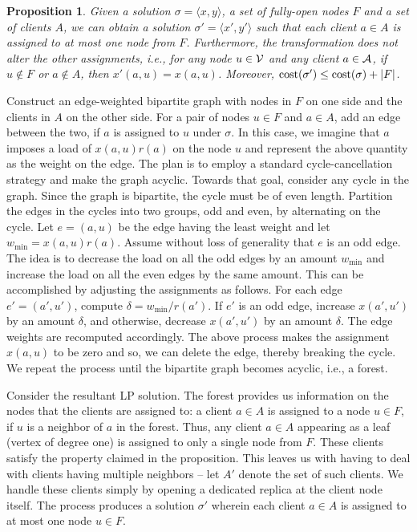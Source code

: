 \documentclass[11pt]{article}
\newtheorem{proposition}{Proposition}[section]
\newcommand{\calA} {{\cal A}}
\newcommand{\calV} {{\cal V}}
\newcommand{\pair}[2] {\langle #1, #2\rangle}
\newcommand{\wmin} {w_{\min}}
\newcommand{\cost} {{\rm cost}}
\begin{document}
\begin{proposition}
\label{prop:single-red}
Given a solution $\sigma=\pair{x}{y}$, a set of fully-open nodes $F$ and a set of clients $A$,
we can obtain a solution $\sigma'=\pair{x'}{y'}$ such that
each client $a\in A$ is assigned to at most one node from $F$. 
Furthermore, the transformation does not alter the other assignments, 
i.e., for any node $u\in \calV$ and any client $a\in \calA$, if $u\not\in F$ or $a\not\in A$, 
then $x'(a,u) = x(a,u)$. Moreover, $\cost(\sigma') \leq \cost(\sigma) + |F|$.
\end{proposition}
\proof
Construct an edge-weighted bipartite graph with nodes in $F$ on one side
and the clients in $A$ on the other side. For a pair of nodes $u\in F$ and $a\in A$,
add an edge between the two, if $a$ is assigned to $u$ under $\sigma$.
In this case, we imagine that $a$ imposes a load of $x(a, u)r(a)$ on the node $u$
and represent the above quantity as the weight on the edge.
The plan is to employ a standard cycle-cancellation strategy and make the graph acyclic.
Towards that goal, consider any cycle in the graph. Since the graph is bipartite,
the cycle must be of even length. Partition the edges in the cycles into two groups,
odd and even, by alternating on the cycle. 
Let $e=(a, u)$ be the edge having the least weight and let $\wmin = x(a, u)r(a)$.
Assume without loss of generality that $e$ is an odd edge.
The idea is to decrease the load on all the odd edges by an amount $\wmin$ and
increase the load on all the even edges by the same amount.
This can be accomplished by adjusting the assignments as follows.
For each edge $e' = (a', u')$, compute $\delta = \wmin/r(a')$.
If $e'$ is an odd edge, increase $x(a', u')$ by an amount $\delta$,
and otherwise, decrease $x(a', u')$ by an amount $\delta$.
The edge weights are recomputed accordingly.
The above process makes the assignment $x(a, u)$ to be zero
and so, we can delete the edge, thereby breaking the cycle.
We repeat the process until the bipartite graph becomes acyclic, i.e., a forest.

Consider the resultant LP solution. The forest provides us information on the nodes that the clients are assigned to:
a client $a\in A$ is assigned to a node $u\in F$, if  $u$ is a neighbor of $a$ in the forest.
Thus, any client $a\in A$ appearing as a leaf (vertex of degree one)
is assigned to only a single node from $F$. These clients satisfy the property claimed in the proposition.
This leaves us with having to deal with clients having multiple neighbors
-- let $A'$ denote the set of such clients.
We handle these clients simply by opening a dedicated replica at the client node itself.
The process produces a solution $\sigma'$ wherein each client $a\in A$ is assigned to at most one node $u\in F$.
\end{document}
